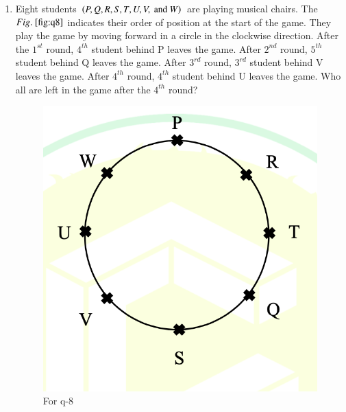 \documentclass[journal,12pt,onecolumn]{IEEEtran}
\theoremstyle{remark}
\begin{document}
\begin{enumerate}
\begin{enumerate}
\end{enumerate}

\item Eight students $\left(P, Q, R, S, T, U, V, \text{ and } W\right)$ are playing musical chairs. The $\figref{fig:q8}$ indicates their order of position at the start of the game. They play the game by moving forward in a circle in the clockwise direction. After the $1^{st}$ round, $4^{th}$ student behind P leaves the game. After $2^{nd}$ round, $5^{th}$ student behind Q leaves the game. After $3^{rd}$ round, $3^{rd}$ student behind V leaves the game. After $4^{th}$ round, $4^{th}$ student behind U leaves the game. Who all are left in the game after the $4^{th}$ round?
\begin{figure}[H]
\centering
\includegraphics[width=0.4\columnwidth]{q8}
\caption{For q-8}
\label{fig:q8}
\end{figure}

\hfill{}

\begin{enumerate}
\end{enumerate}


\end{enumerate}
\end{document}
